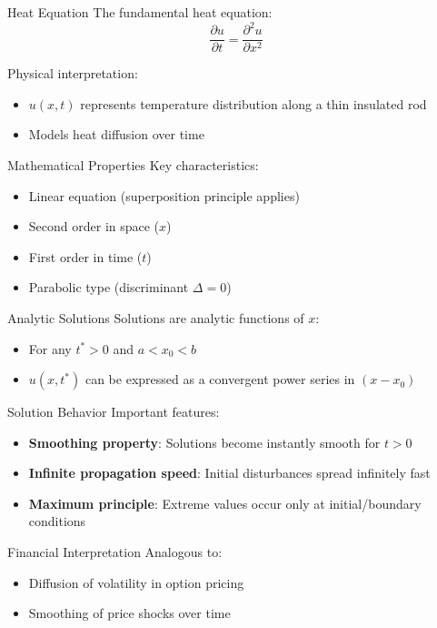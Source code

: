 \documentclass{beamer}
\begin{document}
\begin{frame}{Heat Equation}
    The fundamental heat equation:
    \[
    \frac{\partial u}{\partial t} = \frac{\partial^2 u}{\partial x^2}
    \]
    
    Physical interpretation:
    \begin{itemize}
        \item $u(x,t)$ represents temperature distribution along a thin insulated rod
        \item Models heat diffusion over time
    \end{itemize}
\end{frame}

\begin{frame}{Mathematical Properties}
    Key characteristics:
    \begin{itemize}
        \item Linear equation (superposition principle applies)
        \item Second order in space ($x$)
        \item First order in time ($t$)
        \item Parabolic type (discriminant $\Delta = 0$)
    \end{itemize}
    
    \begin{block}{Analytic Solutions}
        Solutions are analytic functions of $x$:
        \begin{itemize}
            \item For any $t^* > 0$ and $a < x_0 < b$
            \item $u(x,t^*)$ can be expressed as a convergent power series in $(x-x_0)$
        \end{itemize}
    \end{block}
\end{frame}

\begin{frame}{Solution Behavior}
    Important features:
    \begin{itemize}
        \item \textbf{Smoothing property}: Solutions become instantly smooth for $t>0$
        \item \textbf{Infinite propagation speed}: Initial disturbances spread infinitely fast
        \item \textbf{Maximum principle}: Extreme values occur only at initial/boundary conditions
    \end{itemize}
    
    \begin{alertblock}{Financial Interpretation}
        Analogous to:
        \begin{itemize}
            \item Diffusion of volatility in option pricing
            \item Smoothing of price shocks over time
        \end{itemize}
    \end{alertblock}
\end{frame}
\end{document}
